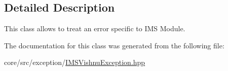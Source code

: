 \subsection{Detailed Description}
This class allows to treat an error specific to IMS Module. 

The documentation for this class was generated from the following file:\begin{DoxyCompactItemize}
\item 
core/src/exception/\hyperlink{IMSVishnuException_8hpp}{IMSVishnuException.hpp}\end{DoxyCompactItemize}
